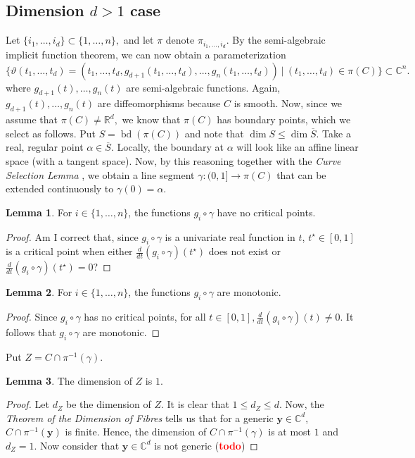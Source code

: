 \documentclass[10pt]{article}
\theoremstyle{definition}
\newtheorem{lemma}{Lemma}
\newcommand{\C}{\mathbb{C}}
\newcommand{\R}{\mathbb{R}}
\def\td{(\textcolor{red}{{\bf todo}})}
\def\td{(\textcolor{red}{{\bf todo}}) }
\DeclareMathOperator{\bd}{bd}
\begin{document}
\subsection{Dimension $d>1$ case}
Let $\{i_1,\hdots,i_d\} \subset \{1,\hdots,n\},$ and let $\pi$ denote $\pi_{i_1,\hdots,i_d}.$ By the semi-algebraic implicit function theorem, we can now obtain a parameterization
\[
\big\{\vartheta(t_1,\hdots,t_d) = \left(t_1,\hdots,t_d,g_{d+1}(t_1,\hdots,t_d),\hdots,g_{n}(t_1,\hdots,t_d)\right)~|~ (t_1,\hdots,t_d) \in \pi(C)\big\} \subset \C^n.
\]
where $g_{d+1}(t),\hdots,g_n(t)$ are semi-algebraic functions.  Again, $g_{d+1}(t),\hdots,g_n(t)$ are diffeomorphisms because $C$ is smooth. Now, since we assume that $\pi(C) \not = \R^d,$ we know that $\pi(C)$ has boundary points, which we select as follows. Put $S = \bd\left( \pi(C) \right)$ and note that $\dim S \leq \dim \overline{S}.$ Take a real, regular point $\alpha \in \overline{S}.$ Locally, the boundary at $\alpha$ will look like an affine linear space (with a tangent space). Now, by this reasoning together with the \textit{Curve Selection Lemma} \cite{CurveSelectionLemma},  
we obtain a line segment $\gamma: (0,1] \rightarrow \pi(C)$ that can be extended continuously to $\gamma(0)=\alpha.$ 
%
\begin{lemma}
For $i \in \{1,\hdots,n\}$, the functions $g_i \circ \gamma$ have no critical points. 
\end{lemma}
%
%
\begin{proof}
\color{red} Am I correct that, since $g_i \circ \gamma$ is a univariate real function in $t$,  $t^\star \in [0,1]$ is a critical point when either  $\frac{d}{dt}\left(g_i \circ \gamma\right)(t^\star)$ does not exist or $\frac{d}{dt}\left(g_i \circ \gamma\right)(t^\star)=0$?\color{black}
\end{proof}
%
%
\begin{lemma}
For $i \in \{1,\hdots,n\}$, the functions $g_i \circ \gamma$ are monotonic. 
\end{lemma}
%
%
\begin{proof}
Since $g_i \circ \gamma$ has no critical points, for all $t \in [0,1], \frac{d}{dt}\left(g_i \circ \gamma\right)(t)\not =0.$ It follows that $g_i \circ \gamma$ are monotonic. 
\end{proof}
%
\noindent 
Put $Z = C \cap \pi^{-1}(\gamma).$ 
%
\begin{lemma}
The dimension of $Z$ is $1$. 
\end{lemma}
%
%
\begin{proof}
Let $d_Z$ be the dimension of $Z$. It is clear that $1 \leq d_Z \leq d$. Now, the 
\textit{Theorem of the Dimension of Fibres}\cite{Shafarevich} tells us that for a generic $\bm y \in \C^d$, $C \cap \pi^{-1}(\bm y)$ is finite. Hence, the dimension of $C \cap \pi^{-1}(\gamma)$ is at most $1$ and $d_Z=1$. Now consider that $\bm y \in \C^d$ is not generic \td  
\end{proof}
\end{document}
